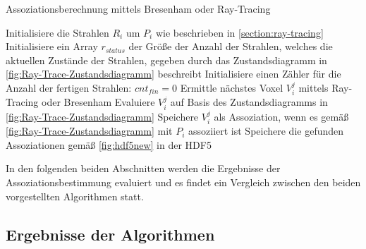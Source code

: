 \begin{algorithm}
\caption{Assoziationsberechnung mittels Bresenham oder Ray-Tracing} \label{pseudo:associations}
\begin{algorithmic}[1]
	\State Initialisiere die Strahlen $R_i$ um $P_{i}$ wie beschrieben in \ref{section:ray-tracing}
	\State Initialisiere ein Array $r_{status}$ der Größe der Anzahl der Strahlen, welches die aktuellen Zustände der Strahlen, gegeben durch das Zustandsdiagramm in \ref{fig:Ray-Trace-Zustandsdiagramm} beschreibt
	\State Initialisiere einen Zähler für die Anzahl der fertigen Strahlen: $cnt_{fin} = 0$
			\State Ermittle nächstes Voxel $V_i^j$ mittels Ray-Tracing oder Bresenham
			\State Evaluiere $V_i^j$ auf Basis des Zustandsdiagramms in \ref{fig:Ray-Trace-Zustandsdiagramm}
			\State Speichere $V_i^j$ als Assoziation, wenn es gemäß \ref{fig:Ray-Trace-Zustandsdiagramm} mit $P_i$ assoziiert ist
		\EndFor \label{Rays-Loop}
	\EndWhile
	\State Speichere die gefunden Assoziationen gemäß \ref{fig:hdf5new} in der HDF5
\EndProcedure
\end{algorithmic}
\end{algorithm}

In den folgenden beiden Abschnitten werden die Ergebnisse der Assoziationsbestimmung evaluiert und es findet ein Vergleich zwischen den beiden vorgestellten Algorithmen statt.

\subsection{Ergebnisse der Algorithmen}
\label{section:association_results}

